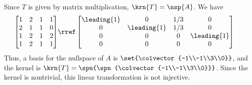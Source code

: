 Since $T$ is given by matrix multiplication, $\krn{T} = \nsp{A}$.  We have
%
\begin{align*}
\begin{bmatrix} 
1 & 2 & 1 & 1\\ 
2 & 1 & 1 & 0\\ 
1 & 2 & 1 & 2 \\ 
1 & 2 & 1 & 1 
\end{bmatrix} 
&\rref 
\begin{bmatrix} 
\leading{1} & 0 & 1/3 & 0\\ 
0 & \leading{1} & 1/3 & 0\\ 
0 & 0 & 0 & \leading{1}\\ 
0 & 0 & 0 & 0
\end{bmatrix}
\end{align*}
%
Thus, a basis for the nullspace of $A$ is $\set{\colvector{-1\\-1\\3\\0}}$, and the kernel is $\krn{T} = \spn{\spn{\colvector{-1\\-1\\3\\0}}}$.  Since the kernel is nontrivial, this linear transformation is not injective.
